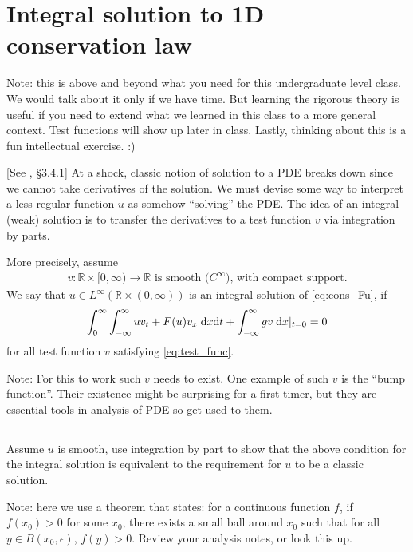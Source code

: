 \documentclass[11pt,letterpaper]{report}
\begin{document}
\section{Integral solution to 1D conservation law}
Note: this is above and beyond what you need for this undergraduate level class. We would talk about it only if we have time. But learning the rigorous theory is useful if you need to extend what we learned in this class to a more general context. Test functions will show up later in class. Lastly, thinking about this is a fun intellectual exercise. :)

[See \cite{Evans_10}, \S 3.4.1] At a shock, classic notion of solution to a PDE breaks down since we cannot take derivatives of the solution. We must devise some way to interpret a less regular function $u$ as somehow ``solving'' the PDE. The idea of an integral (weak) solution is to transfer the derivatives to a test function $v$ via integration by parts. 

More precisely, assume
\begin{align}
    v: \mathbb{R}\times[0,\infty)\to\mathbb{R} \text{ is smooth ($C^\infty$), with compact support}.\label{eq:test_func}
\end{align}
We say that $u\in L^\infty(\mathbb{R}\times(0,\infty))$ is an integral solution of \eqref{eq:cons_Fu}, if
\begin{align}
    \int^\infty_0\int^\infty_{-\infty} uv_t+F(u)v_x\;\mathrm{d} x\mathrm{d} t+\int^\infty_{-\infty} gv\;\mathrm{d} x|_{t=0} = 0
\end{align}
for all test function $v$ satisfying \eqref{eq:test_func}.

Note: For this to work such $v$ needs to exist. One example of such $v$ is the ``bump function''. Their existence might be surprising for a first-timer, but they are essential tools in analysis of PDE so get used to them.

\subsection{}
Assume $u$ is smooth, use integration by part to show that the above condition for the integral solution is equivalent to the requirement for $u$ to be a classic solution.

Note: here we use a theorem that states: for a continuous function $f$, if $f(x_0)>0$ for some $x_0$, there exists a small ball around $x_0$ such that for all $y\in B(x_0,\epsilon)$, $f(y)>0$. Review your analysis notes, or look this up.
\end{document}
